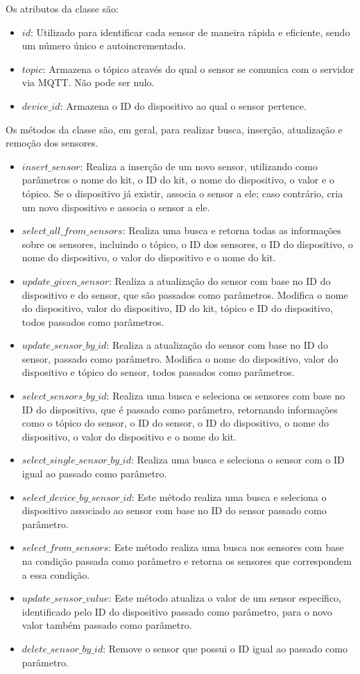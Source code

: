\documentclass[conference, a4paper, 12pt]{IEEEtran}
\begin{document}
Os atributos da classe são:
\begin{itemize}
  \item $id$: Utilizado para identificar cada sensor de maneira rápida e eficiente, sendo um número único e autoincrementado.
  \item $topic$: Armazena o tópico através do qual o sensor se comunica com o servidor via MQTT. Não pode ser nulo.
  \item $device\_id$:  Armazena o ID do dispositivo ao qual o sensor pertence.
\end{itemize}

Os métodos da classe são, em geral, para realizar busca, inserção, atualização e remoção dos sensores.

\begin{itemize}
  \item $insert\_sensor$: Realiza a inserção de um novo sensor, utilizando como parâmetros o nome do kit, o ID do kit, o nome do dispositivo, o valor e o tópico. Se o dispositivo já existir, associa o sensor a ele; caso contrário, cria um novo dispositivo e associa o sensor a ele.
  \item $select\_all\_from\_sensors$: Realiza uma busca e retorna todas as informações sobre os sensores, incluindo o tópico, o ID dos sensores, o ID do dispositivo, o nome do dispositivo, o valor do dispositivo e o nome do kit.
  \item $update\_given\_sensor$: Realiza a atualização do sensor com base no ID do dispositivo e do sensor, que são passados como parâmetros. Modifica o nome do dispositivo, valor do dispositivo, ID do kit, tópico e ID do dispositivo, todos passados como parâmetros.
  \item $update\_sensor\_by\_id$: Realiza a atualização do sensor com base no ID do sensor, passado como parâmetro. Modifica o nome do dispositivo, valor do dispositivo e tópico do sensor, todos passados como parâmetros.
  \item $select\_sensors\_by\_id$: Realiza uma busca e seleciona os sensores com base no ID do dispositivo, que é passado como parâmetro, retornando informações como o tópico do sensor, o ID do sensor, o ID do dispositivo, o nome do dispositivo, o valor do dispositivo e o nome do kit.
  \item $select\_single\_sensor\_by\_id$: Realiza uma busca e seleciona o sensor com o ID igual ao passado como parâmetro.
  \item $select\_device\_by\_sensor\_id$: Este método realiza uma busca e seleciona o dispositivo associado ao sensor com base no ID do sensor passado como parâmetro.
  \item $select\_from\_sensors$: Este método realiza uma busca nos sensores com base na condição passada como parâmetro e retorna os sensores que correspondem a essa condição.
  \item $update\_sensor\_value$: Este método atualiza o valor de um sensor específico, identificado pelo ID do dispositivo passado como parâmetro, para o novo valor também passado como parâmetro.
  \item $delete\_sensor\_by\_id$: Remove o sensor que possui o ID igual ao passado como parâmetro.
\end{itemize}
\end{document}

